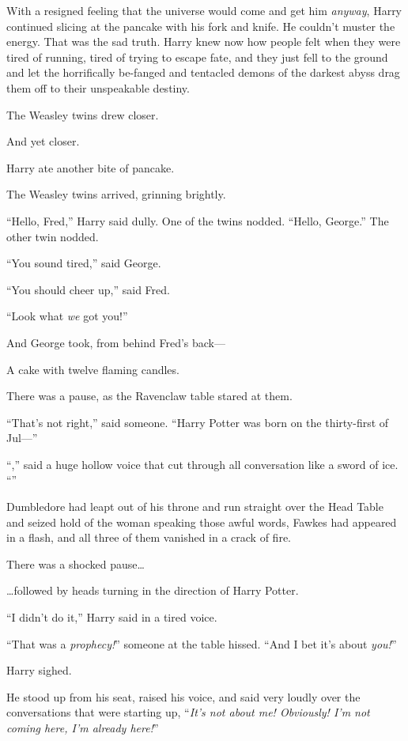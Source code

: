 With a resigned feeling that the universe would come and get him \emph{anyway}, Harry continued slicing at the pancake with his fork and knife. He couldn’t muster the energy. That was the sad truth. Harry knew now how people felt when they were tired of running, tired of trying to escape fate, and they just fell to the ground and let the horrifically be-fanged and tentacled demons of the darkest abyss drag them off to their unspeakable destiny.

The Weasley twins drew closer.

And yet closer.

Harry ate another bite of pancake.

The Weasley twins arrived, grinning brightly.

“Hello, Fred,” Harry said dully. One of the twins nodded. “Hello, George.” The other twin nodded.

“You sound tired,” said George.

“You should cheer up,” said Fred.

“Look what \emph{we} got you!”

And George took, from behind Fred’s back—

A cake with twelve flaming candles.

There was a pause, as the Ravenclaw table stared at them.

“That’s not right,” said someone. “Harry Potter was born on the thirty-first of Jul—”

“,” said a huge hollow voice that cut through all conversation like a sword of ice. “”

Dumbledore had leapt out of his throne and run straight over the Head Table and seized hold of the woman speaking those awful words, Fawkes had appeared in a flash, and all three of them vanished in a crack of fire.

There was a shocked pause…

…followed by heads turning in the direction of Harry Potter.

“I didn’t do it,” Harry said in a tired voice.

“That was a \emph{prophecy!}” someone at the table hissed. “And I bet it’s about \emph{you!}”

Harry sighed.

He stood up from his seat, raised his voice, and said very loudly over the conversations that were starting up, “\emph{It’s not about me! Obviously! I’m not coming here, I’m already here!}”


